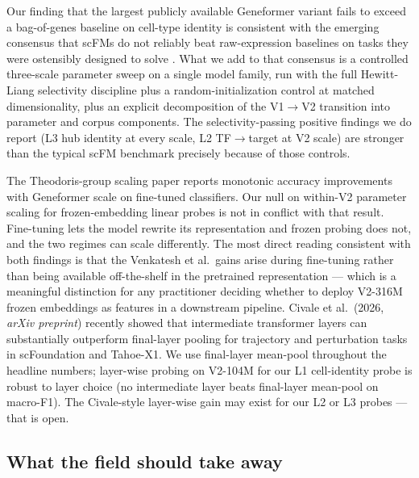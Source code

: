 \documentclass[
  11pt,
]{article}
\begin{document}
Our finding that the largest publicly available Geneformer variant fails
to exceed a bag-of-genes baseline on cell-type identity is consistent
with the emerging consensus that scFMs do not reliably beat
raw-expression baselines on tasks they were ostensibly designed to solve
\citep{boiarsky2025}. What we add to that consensus is a controlled three-scale
parameter sweep on a single model family, run with the full Hewitt-Liang
selectivity discipline plus a random-initialization control at matched
dimensionality, plus an explicit decomposition of the V1$\to$V2 transition
into parameter and corpus components. The selectivity-passing positive
findings we do report (L3 hub identity at every scale, L2 TF$\to$target at
V2 scale) are stronger than the typical scFM benchmark precisely because
of those controls.

The Theodoris-group scaling paper \citep{venkatesh2026} reports monotonic accuracy improvements with
Geneformer scale on fine-tuned classifiers. Our null on within-V2
parameter scaling for frozen-embedding linear probes is not in conflict
with that result. Fine-tuning lets the model rewrite its representation
and frozen probing does not, and the two regimes can scale differently.
The most direct reading consistent with both findings is that the
Venkatesh et al.~gains arise during fine-tuning rather than being
available off-the-shelf in the pretrained representation --- which is a
meaningful distinction for any practitioner deciding whether to deploy
V2-316M frozen embeddings as features in a downstream pipeline. Civale
et al.~(2026, \emph{arXiv preprint}) recently showed that intermediate
transformer layers can substantially outperform final-layer pooling for
trajectory and perturbation tasks in scFoundation and Tahoe-X1. We use
final-layer mean-pool \citep{reimers2019sbert} throughout the headline
numbers; layer-wise probing on V2-104M for our L1 cell-identity probe is
robust to layer choice (no intermediate layer beats final-layer
mean-pool on macro-F1). The Civale-style layer-wise gain may exist for
our L2 or L3 probes --- that is open.

\subsection{What the field should take
away}\label{what-the-field-should-take-away}
\end{document}
